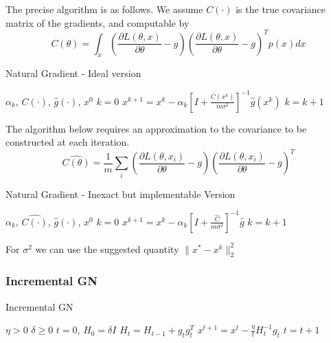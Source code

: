 \documentclass[12pt]{article}
\begin{document}
The precise algorithm is as follows. We assume $C(\cdot)$ is the true covariance matrix of the gradients, and computable by 
\begin{equation}
	C(\theta) = \int_x \left( \frac{\partial L(\theta,x)}{\partial \theta}-g\right) \left(\frac{\partial L(\theta,x)}{\partial \theta}-g \right)^T p(x) dx
\end{equation}

\begin{algorithm}[H]
\caption{Natural Gradient - Ideal version}
\label{alg1}
\begin{algorithmic}[1]
\REQUIRE  $\alpha_k$, $C(\cdot)$, $\hat{g}(\cdot)$, $x^0$
\STATE  $k=0$
\STATE $x^{k+1} = x^k - \alpha_k \left[ I +  \frac{C(x^k)}{m \sigma^2}\right]^{-1} \hat{g}(x^k)$
\STATE $k=k+1$
\ENDWHILE
\end{algorithmic}
\end{algorithm}

The algorithm below requires an approximation to the covariance to be constructed at each iteration. 
\begin{equation}
	\hat{C(\theta)} = \frac{1}{m} \sum_i \left( \frac{\partial L(\theta,x_i)}{\partial \theta}-g\right) \left(\frac{\partial L(\theta,x_i)}{\partial \theta}-g \right)^T
\end{equation}

\begin{algorithm}[H]
\caption{Natural Gradient - Inexact but implementable Version}
\label{alg1}
\begin{algorithmic}[1]
\REQUIRE  $\alpha_k$, $\hat{C(\cdot)}$, $\hat{g}(\cdot)$, $x^0$
\STATE  $k=0$
\STATE $x^{k+1} = x^k - \alpha_k \left[ I +  \frac{\hat{C}}{m \sigma^2}\right]^{-1} \hat{g}$
\STATE $k=k+1$
\ENDWHILE
\end{algorithmic}
\end{algorithm}

For $\sigma^2$ we can use the suggested quantity $\| x^*-x^k\|^2_2$


\subsubsection{Incremental GN}

\begin{algorithm}[H]
\caption{Incremental GN}
\label{alg1}
\begin{algorithmic}[1]
\REQUIRE  $\eta>0$ $\delta \geq 0$
\STATE  $t=0$, $H_0 = \delta I $
\STATE $H_t = H_{t-1}+ g_t  g_t^T$
\STATE $x^{t+1} = x^t - \frac{\eta}{t} H_t^{-1} g_t$
\STATE $t=t+1$
\ENDWHILE
\end{algorithmic}
\end{algorithm}
\end{document}
